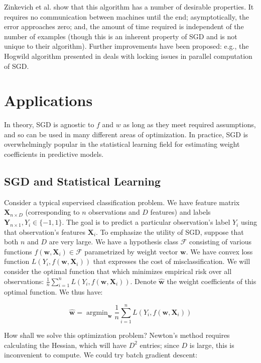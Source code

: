 \documentclass{article}
\DeclareMathOperator*{\argmin}{argmin}
\begin{document}
\medskip

Zinkevich et al. show that this algorithm has a number of desirable properties.
It requires no communication between machines until the end; asymptotically, the
error approaches zero; and, the amount of time required is independent of the number of
examples (though this is an inherent property of SGD and is not unique to their
algorithm). Further improvements have been proposed: e.g., the Hogwild algorithm
presented in \cite{recht2011hogwild} deals with locking issues in parallel
computation of SGD.

\section{Applications}

In theory, SGD is agnostic to $f$ and $w$ as long as they meet required
assumptions, and so can be used in many different areas of optimization. In
practice, SGD is overwhelmingly popular in the statistical learning
field for estimating weight coefficients in predictive models. 

\subsection{SGD and Statistical Learning}

Consider a typical supervised classification problem. We have
feature matrix $\bm{X}_{n \times D}$ (corresponding to $n$ observations and $D$
features) and labels $\bm{Y}_{n \times 1}, Y_i \in \{-1, 1\}$. The goal is to
predict a particular observation's label $Y_i$ using that observation's features
$\bm{X}_i$. To emphasize the utility of SGD, suppose that both $n$ and $D$ are
very large.
We have a hypothesis class $\mathcal{F}$ consisting of
various functions $f(\bm{w}, \bm{X}_i) \in \mathcal{F}$ parametrized by weight
vector $\bm{w}$. We have convex loss function $L(Y_i, f(\bm{w}, \bm{X}_i))$ that
expresses the cost of misclassification. 
We will consider the optimal function
that which minimizes empirical risk over all observations: $\frac{1}{n}
\sum_{i=1}^n L(Y_i, f(\bm{w}, \bm{X}_i))$.
Denote $\hat{\bm{w}}$ the weight coefficients of this optimal function. We thus
have:

\begin{equation}
	\hat{\bm{w}} = \argmin_{\bm{w}}\frac{1}{n} \sum_{i=1}^n L(Y_i, f(\bm{w}, \bm{X}_i))
\end{equation}

How shall we solve this optimization problem? Newton's method requires
calculating the Hessian, which will have $D^2$ entries; since $D$ is large,
this is inconvenient to compute. We could try batch gradient descent:
\end{document}

